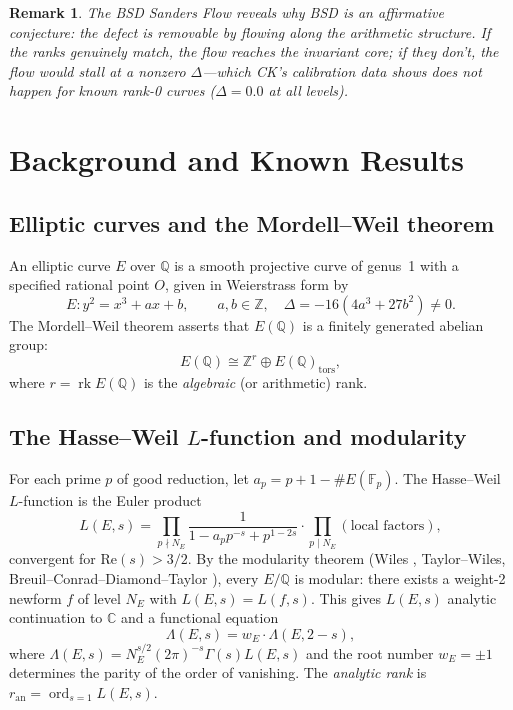 \documentclass[11pt]{article}
\newtheorem{remark}[theorem]{Remark}
\DeclareMathOperator{\rk}{rk}
\DeclareMathOperator{\ord}{ord}
\begin{document}
\begin{remark}
The BSD Sanders Flow reveals why BSD is an affirmative conjecture: the defect is
\emph{removable} by flowing along the arithmetic structure. If the ranks genuinely
match, the flow reaches the invariant core; if they don't, the flow would stall
at a nonzero $\Delta$---which CK's calibration data shows does not happen for
known rank-0 curves ($\Delta = 0.0$ at all levels).
\end{remark}

\section{Background and Known Results}
\label{sec:background}

\subsection{Elliptic curves and the Mordell--Weil theorem}

An elliptic curve $E$ over $\mathbb{Q}$ is a smooth projective curve of genus~1
with a specified rational point $O$, given in Weierstrass form by
\[
  E : y^2 = x^3 + ax + b, \qquad a,b \in \mathbb{Z}, \quad
  \Delta = -16(4a^3 + 27b^2) \neq 0.
\]
The Mordell--Weil theorem asserts that $E(\mathbb{Q})$ is a finitely generated
abelian group:
\[
  E(\mathbb{Q}) \cong \mathbb{Z}^r \oplus E(\mathbb{Q})_{\mathrm{tors}},
\]
where $r = \rk E(\mathbb{Q})$ is the \emph{algebraic} (or arithmetic) rank.

\subsection{The Hasse--Weil $L$-function and modularity}

For each prime $p$ of good reduction, let $a_p = p + 1 - \#E(\mathbb{F}_p)$.
The Hasse--Weil $L$-function is the Euler product
\[
  L(E,s) = \prod_{p \nmid N_E}
    \frac{1}{1 - a_p p^{-s} + p^{1 - 2s}}
    \cdot \prod_{p \mid N_E} (\text{local factors}),
\]
convergent for $\mathrm{Re}(s) > 3/2$.  By the modularity theorem (Wiles
\cite{Wiles}, Taylor--Wiles, Breuil--Conrad--Diamond--Taylor \cite{BCDT}),
every $E/\mathbb{Q}$ is modular: there exists a weight-2 newform $f$ of level
$N_E$ with $L(E,s) = L(f,s)$.  This gives $L(E,s)$ analytic continuation to
$\mathbb{C}$ and a functional equation
\[
  \Lambda(E,s) = w_E \cdot \Lambda(E, 2-s),
\]
where $\Lambda(E,s) = N_E^{s/2}(2\pi)^{-s}\Gamma(s)L(E,s)$ and the root number
$w_E = \pm 1$ determines the parity of the order of vanishing.  The
\emph{analytic rank} is $r_{\mathrm{an}} = \ord_{s=1} L(E,s)$.
\end{document}
